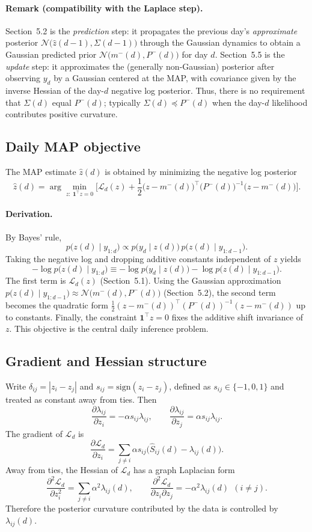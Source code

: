 \documentclass[11pt]{article}
\begin{document}
\paragraph{Remark (compatibility with the Laplace step).}
Section~5.2 is the \emph{prediction} step: it propagates the previous day's \emph{approximate} posterior
$\mathcal N\!\big(\widehat z(d-1),\Sigma(d-1)\big)$ through the Gaussian dynamics to obtain a Gaussian predicted prior
$\mathcal N\!\big(m^-(d),P^-(d)\big)$ for day $d$.
Section~5.5 is the \emph{update} step: it approximates the (generally non-Gaussian) posterior after observing $y_d$
by a Gaussian centered at the MAP, with covariance given by the inverse Hessian of the day-$d$ negative log posterior.
Thus, there is no requirement that $\Sigma(d)$ equal $P^-(d)$; typically $\Sigma(d)\preceq P^-(d)$ when the day-$d$
likelihood contributes positive curvature.

\subsection{Daily MAP objective}
The MAP estimate $\widehat z(d)$ is obtained by minimizing the negative log posterior
\[
\widehat z(d)
=
\arg\min_{z:\ \mathbf{1}^\top z=0}
\Big[
\mathcal L_d(z)
+\frac12\big(z-m^-(d)\big)^\top \big(P^-(d)\big)^{-1}\big(z-m^-(d)\big)
\Big].
\]
\paragraph{Derivation.}
By Bayes' rule,
\[
p\big(z(d)\mid y_{1:d}\big)\propto p\big(y_d\mid z(d)\big)\,p\big(z(d)\mid y_{1:d-1}\big).
\]
Taking the negative log and dropping additive constants independent of $z$ yields
\[
-\log p\big(z(d)\mid y_{1:d}\big)
\equiv
-\log p\big(y_d\mid z(d)\big)-\log p\big(z(d)\mid y_{1:d-1}\big).
\]
The first term is $\mathcal L_d(z)$ (Section~5.1).
Using the Gaussian approximation $p\big(z(d)\mid y_{1:d-1}\big)\approx \mathcal N\!\big(m^-(d),P^-(d)\big)$ (Section~5.2), the second term becomes the quadratic form $\tfrac12(z-m^-(d))^\top (P^-(d))^{-1}(z-m^-(d))$ up to constants.
Finally, the constraint $\mathbf{1}^\top z=0$ fixes the additive shift invariance of $z$.
This objective is the central daily inference problem.

\subsection{Gradient and Hessian structure}
Write $\delta_{ij}=|z_i-z_j|$ and $s_{ij}=\mathrm{sign}(z_i-z_j)$, defined as $s_{ij}\in\{-1,0,1\}$ and treated as constant away from ties.
Then
\[
\frac{\partial \lambda_{ij}}{\partial z_i} = -\alpha s_{ij}\lambda_{ij},
\qquad
\frac{\partial \lambda_{ij}}{\partial z_j} = \alpha s_{ij}\lambda_{ij}.
\]
The gradient of $\mathcal L_d$ is
\[
\frac{\partial \mathcal L_d}{\partial z_i}
=
\sum_{j\ne i}\alpha s_{ij}\big(\widehat S_{ij}(d)-\lambda_{ij}(d)\big).
\]
Away from ties, the Hessian of $\mathcal L_d$ has a graph Laplacian form
\[
\frac{\partial^2 \mathcal L_d}{\partial z_i^2}
=
\sum_{j\ne i}\alpha^2 \lambda_{ij}(d),
\qquad
\frac{\partial^2 \mathcal L_d}{\partial z_i\partial z_j}
=
-\alpha^2 \lambda_{ij}(d)\ \ (i\ne j).
\]
Therefore the posterior curvature contributed by the data is controlled by $\lambda_{ij}(d)$.
\end{document}

